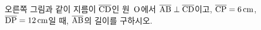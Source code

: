\noindent\begin{minipage}[t]{0.58\linewidth}\vspace{0pt}\raggedright 오른쪽 그림과 같이 지름이 $\overline{\mathrm{CD}}$인 원~$\mathrm{O}$에서 $\overline{\mathrm{AB}}\perp\overline{\mathrm{CD}}$이고, $\overline{\mathrm{CP}}=6\,\mathrm{cm}$, $\overline{\mathrm{DP}}=12\,\mathrm{cm}$일 때, $\overline{\mathrm{AB}}$의 길이를 구하시오.\end{minipage}\hfill\begin{minipage}[t]{0.4\linewidth}\vspace{0pt}\centering \resizebox{\ifdim\width>\linewidth\linewidth\else\width\fi}{!}{}\end{minipage}\par
